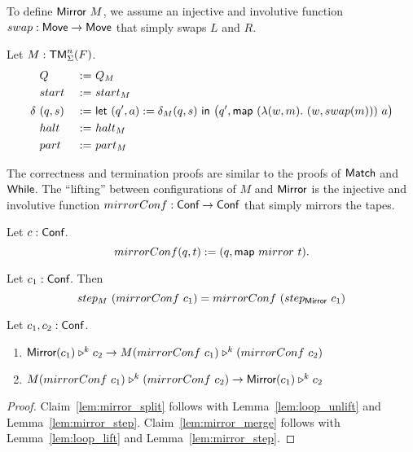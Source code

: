 To define $\MS{Mirror}~M$, we assume an injective and involutive function $swap:\textsf{Move} \rightarrow \textsf{Move}$ that simply swaps $L$ and $R$.

\begin{definition}[$\MS{Mirror}~M$]
  \label{def:Mirror}
  Let $M:\textsf{TM}_\Sigma^n(F)$.
  \begin{alignat*}{3}
    & Q                  &~:=~& Q_M \\
    & start              &~:=~& start_M \\
    \delta~&(q, s)       &~:=~& \textsf{let}~(q', a) := \delta_M(q,s)~\textsf{in}~\bigl(q', \textsf{map}~(\lambda(w, m).~(w, swap(m)))~a \bigr) \\
    & halt               &~:=~& halt_M \\
    & part               &~:=~& part_M
  \end{alignat*}
\end{definition}

The correctness and termination proofs are similar to the proofs of $\textsf{Match}$ and $\textsf{While}$.  The ``lifting'' between configurations of $M$ and
$\textsf{Mirror}$ is the injective and involutive function $mirrorConf : \textsf{Conf} \rightarrow \textsf{Conf}$ that simply mirrors the tapes.

\begin{definition}
  \label{def:mirrorConf}
  Let $c : \textsf{Conf}$.
  \[ mirrorConf(q,t) := (q, \textsf{map}~mirror~t). \]
\end{definition}


\begin{lemma}
  \label{lem:mirror_step}
  Let $c_1 : \textsf{Conf}$.  Then
  \[ step_M~(mirrorConf~c_1) = mirrorConf~(step_{\textsf{Mirror}}~c_1) \]
\end{lemma}

\begin{lemma}
  \label{lem:mirror_loop}
  Let $c_1, c_2 : \textsf{Conf}$.
  \begin{enumerate}
  \item \label{lem:mirror_split}
    $ \textsf{Mirror} (c_1) \mathrel{\triangleright}^k c_2 \rightarrow M (mirrorConf~c_1) \mathrel{\triangleright}^k (mirrorConf~c_2) $
  \item \label{lem:mirror_merge}
    $ M (mirrorConf~c_1) \mathrel{\triangleright}^k (mirrorConf~c_2) \rightarrow \textsf{Mirror} (c_1) \mathrel{\triangleright}^k c_2 $
  \end{enumerate}
\end{lemma}
\begin{proof}
  Claim~\ref{lem:mirror_split} follows with Lemma~\ref{lem:loop_unlift} and Lemma~\ref{lem:mirror_step}.  Claim~\ref{lem:mirror_merge} follows with
  Lemma~\ref{lem:loop_lift} and Lemma~\ref{lem:mirror_step}.
\end{proof}

